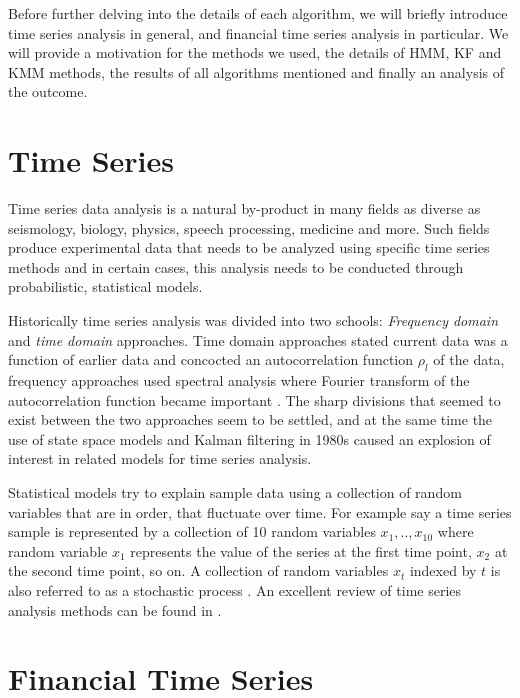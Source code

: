 Before further delving into the details of each algorithm, we will briefly
introduce time series analysis in general, and financial time series analysis in
particular. We will provide a motivation for the methods we used, the details of
HMM, KF and KMM methods, the results of all algorithms mentioned and finally an
analysis of the outcome.

\section{Time Series}

Time series data analysis is a natural by-product in many fields as diverse as
seismology, biology, physics, speech processing, medicine and more. Such fields
produce experimental data that needs to be analyzed using specific time series
methods and in certain cases, this analysis needs to be conducted through
probabilistic, statistical models.

Historically time series analysis was divided into two schools: {\em Frequency
  domain} and {\em time domain} approaches. Time domain approaches stated
current data was a function of earlier data and concocted an autocorrelation
function $\rho_l$ of the data, frequency approaches used spectral analysis where
Fourier transform of the autocorrelation function became important
\cite{tsay}. The sharp divisions that seemed to exist between the two approaches
seem to be settled, and at the same time the use of state space models and
Kalman filtering in 1980s caused an explosion of interest in related models for
time series analysis.

Statistical models try to explain sample data using a collection of random
variables that are in order, that fluctuate over time. For example say a time
series sample is represented by a collection of 10 random variables
$x_1,..,x_{10}$ where random variable $x_1$ represents the value of the series
at the first time point, $x_2$ at the second time point, so on. A collection of
random variables ${x_t}$ indexed by $t$ is also referred to as a stochastic
process \cite{shumway}. An excellent review of time series analysis methods can
be found in \cite{tsay}.

\section{Financial Time Series}

